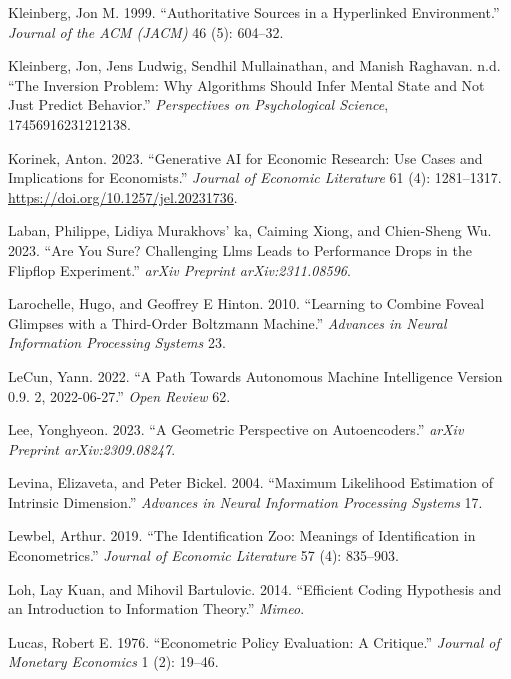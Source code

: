 \documentclass[
]{article}
\newlength{\cslhangindent}
\newenvironment{CSLReferences}[2] %
 {\begin{list}{}{%
  \setlength{\itemindent}{0pt}
  \setlength{\leftmargin}{0pt}
  \setlength{\parsep}{0pt}
  \ifodd #1
   \setlength{\leftmargin}{\cslhangindent}
   \setlength{\itemindent}{-1\cslhangindent}
  \fi
  \setlength{\itemsep}{#2\baselineskip}}}
 {\end{list}}
\begin{document}
\begin{CSLReferences}{1}{0}
Kleinberg, Jon M. 1999. {``Authoritative Sources in a Hyperlinked
Environment.''} \emph{Journal of the ACM (JACM)} 46 (5): 604--32.

Kleinberg, Jon, Jens Ludwig, Sendhil Mullainathan, and Manish Raghavan.
n.d. {``The Inversion Problem: Why Algorithms Should Infer Mental State
and Not Just Predict Behavior.''} \emph{Perspectives on Psychological
Science}, 17456916231212138.

Korinek, Anton. 2023. {``Generative AI for Economic Research: Use Cases
and Implications for Economists.''} \emph{Journal of Economic
Literature} 61 (4): 1281--1317.
\url{https://doi.org/10.1257/jel.20231736}.

Laban, Philippe, Lidiya Murakhovs' ka, Caiming Xiong, and Chien-Sheng
Wu. 2023. {``Are You Sure? Challenging Llms Leads to Performance Drops
in the Flipflop Experiment.''} \emph{arXiv Preprint arXiv:2311.08596}.

Larochelle, Hugo, and Geoffrey E Hinton. 2010. {``Learning to Combine
Foveal Glimpses with a Third-Order Boltzmann Machine.''} \emph{Advances
in Neural Information Processing Systems} 23.

LeCun, Yann. 2022. {``A Path Towards Autonomous Machine Intelligence
Version 0.9. 2, 2022-06-27.''} \emph{Open Review} 62.

Lee, Yonghyeon. 2023. {``A Geometric Perspective on Autoencoders.''}
\emph{arXiv Preprint arXiv:2309.08247}.

Levina, Elizaveta, and Peter Bickel. 2004. {``Maximum Likelihood
Estimation of Intrinsic Dimension.''} \emph{Advances in Neural
Information Processing Systems} 17.

Lewbel, Arthur. 2019. {``The Identification Zoo: Meanings of
Identification in Econometrics.''} \emph{Journal of Economic Literature}
57 (4): 835--903.

Loh, Lay Kuan, and Mihovil Bartulovic. 2014. {``Efficient Coding
Hypothesis and an Introduction to Information Theory.''} \emph{Mimeo}.

Lucas, Robert E. 1976. {``Econometric Policy Evaluation: A Critique.''}
\emph{Journal of Monetary Economics} 1 (2): 19--46.


\end{CSLReferences}
\end{document}
